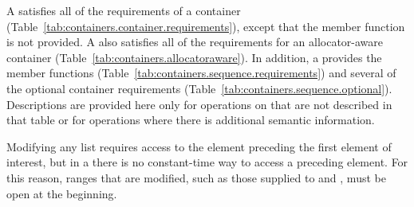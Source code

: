 \pnum
A  satisfies all of the requirements of a container
(Table~\ref{tab:containers.container.requirements}), except that the 
member function is not provided.
A  also satisfies all of the requirements for an allocator-aware
container (Table~\ref{tab:containers.allocatoraware}). In addition, a 
provides the  member functions
(Table~\ref{tab:containers.sequence.requirements}) and several of the optional
container requirements (Table~\ref{tab:containers.sequence.optional}).
Descriptions are provided here only for operations on
 that are not described in that table or for operations where there
is additional semantic information.

\pnum
\enternote Modifying any list requires access to the element preceding the first element
of interest, but in a  there is no constant-time way to access a
preceding element. For this reason, ranges that are modified, such as those supplied to
 and , must be open at the beginning. \exitnote

